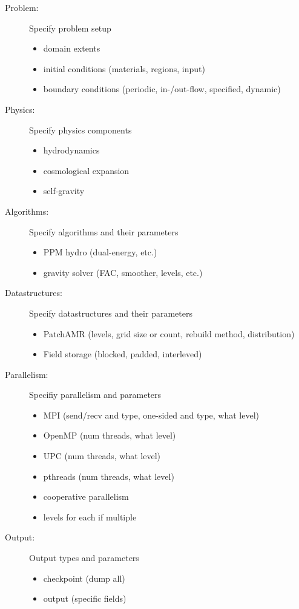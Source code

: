 \documentclass{article}
\begin{document}
\begin{description}
\item[Problem: ] Specify problem setup
\begin{itemize}
\item  domain extents
\item  initial conditions (materials, regions, input)
\item boundary conditions (periodic, in-/out-flow, specified, dynamic)
\end{itemize}
\item[Physics: ] Specify physics components
\begin{itemize}
\item hydrodynamics
\item  cosmological expansion
\item self-gravity
\end{itemize}
\item[Algorithms: ] Specify algorithms and their parameters
\begin{itemize}
\item PPM hydro (dual-energy, etc.)
\item gravity solver (FAC, smoother, levels, etc.)
\end{itemize}
\item[Datastructures: ] Specify datastructures and their parameters
\begin{itemize}
\item PatchAMR (levels, grid size or count, rebuild method, distribution)
\item Field storage (blocked, padded, interleved)
\end{itemize}
\item[Parallelism: ] Specifiy parallelism and parameters
\begin{itemize}
\item MPI (send/recv and type, one-sided and type, what level)
\item OpenMP (num threads, what level)
\item UPC (num threads, what level)
\item pthreads (num threads, what level)
\item cooperative parallelism
\item levels for each if multiple
\end{itemize}
\item[Output: ] Output types and parameters
\begin{itemize}
\item checkpoint (dump all)
\item output (specific fields)

\end{itemize}
\end{description}
\end{document}
